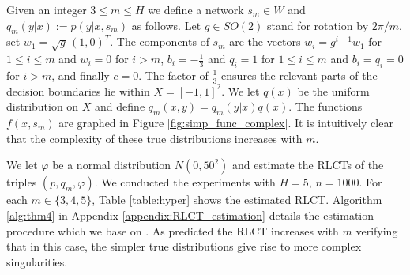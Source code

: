 \documentclass{article} %
\begin{document}
%


Given an integer $3 \le m \le H$ we define a network $s_m \in W$ and $q_m(y|x) := p(y|x, s_m)$ as follows. Let $g \in SO(2)$ stand for rotation by $2\pi/m$, set $w_1 = \sqrt{g} \, (1,0)^T$. The components of $s_m$ are the vectors $w_i = g^{i-1} w_1$ for $1 \le i \le m$ and $w_i = 0$ for $i > m$, $b_i = - \tfrac{1}{3}$ and $q_i = 1$ for $1 \le i \le m$ and $b_i = q_i = 0$ for $i > m$, and finally $c = 0$. The factor of $\tfrac{1}{3}$ ensures the relevant parts of the decision boundaries lie within $X = [-1,1]^2$. We let $q(x)$ be the uniform distribution on $X$ and define $q_m(x,y) = q_m(y|x) q(x)$. The functions $f(x,s_m)$ are graphed in Figure \ref{fig:simp_func_complex}. It is intuitively clear that the complexity of these true distributions increases with $m$.

We let $\varphi$ be a normal distribution $N(0,50^2)$ and estimate the RLCTs of the triples $(p, q_m, \varphi)$. We conducted the experiments with $H = 5$, $n = 1000$. For each $m \in \{3,4,5\}$, Table \ref{table:hyper} shows the estimated RLCT. Algorithm \ref{alg:thm4} in Appendix \ref{appendix:RLCT_estimation} details the estimation procedure which we base on \citep[Theorem 4]{watanabe_widely_2013}. As predicted the RLCT increases with $m$ verifying that in this case, the simpler true distributions give rise to more complex singularities.
\end{document}
